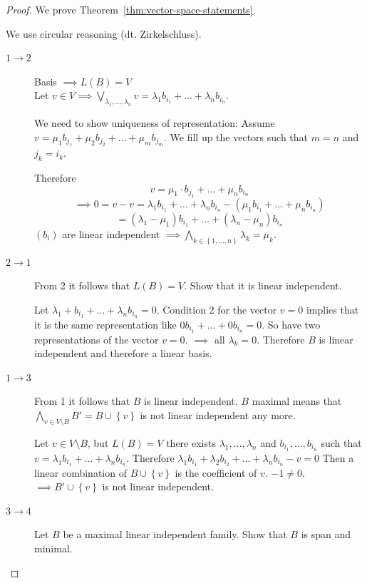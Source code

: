 \documentclass[a4paper,landscape,twocolumn]{article}
\newcommand\set[1]{\left\{#1\right\}}
\begin{document}
\begin{proof}
  We prove Theorem~\ref{thm:vector-space-statements}.

  We use circular reasoning (dt. Zirkelschluss).
  \begin{description}
    \item[$1 \rightarrow 2$]
      Basis $\implies L(B) = V$ \\
      Let $v \in V \implies \bigvee_{\lambda_1, \ldots, \lambda_n} v = \lambda_1 b_{i_1} + \ldots + \lambda_n b_{i_n}$.

      We need to show uniqueness of representation: Assume $v = \mu_1 b_{j_1} + \mu_2 b_{j_2} + \ldots + \mu_m b_{j_m}$.
      We fill up the vectors such that $m = n$ and $j_k = i_k$.

      Therefore
      \[ v = \mu_1 \cdot b_{j_1} + \ldots + \mu_n b_{i_n} \]
      \[
          \implies 0 = v - v = \lambda_1 b_{i_1} + \ldots + \lambda_n b_{i_n}
          - (\mu_1 b_{i_1} + \ldots + \mu_n b_{i_n})
      \] \[
          = (\lambda_1 - \mu_1) b_{i_1} + \ldots + (\lambda_n - \mu_n) b_{i_n}
      \]
      $(b_i)$ are linear independent $\implies \bigwedge_{k \in \set{1, \ldots, n}} \lambda_k = \mu_k$.
    \item[$2 \rightarrow 1$]
      From 2 it follows that $L(B) = V$.
      Show that it is linear independent.

      Let $\lambda_1 + b_{i_1} + \ldots + \lambda_n b_{i_n} = 0$.
      Condition 2 for the vector $v = 0$ implies that it is the same representation
      like $0 b_{i_1} + \ldots + 0 b_{i_n} = 0$.
      So have two representations of the vector $v = 0$.
      $\implies$ all $\lambda_k = 0$. Therefore $B$ is linear independent and therefore a linear basis.
    \item[$1 \rightarrow 3$]
      From 1 it follows that $B$ is linear independent.
      $B$ maximal means that $\bigwedge_{v \in V\setminus B} B' = B \cup \set{v}$ is not linear independent any more.

      Let $v \in V \setminus B$, but $L(B) = V$ there exists $\lambda_1, \ldots, \lambda_n$ and $b_{i_1}, \ldots, b_{i_n}$
      such that $v = \lambda_1 b_{i_1} + \ldots + \lambda_{n} b_{i_n}$.
      Therefore $\lambda_1 b_{i_1} + \lambda_2 b_{i_2} + \ldots + \lambda_n b_{i_n} - v = 0$
      Then a linear combination of $B \cup \set{v}$ is the coefficient of $v$. $-1 \neq 0$.
      $\implies B' \cup \set{v}$ is not linear independent.
    \item[$3 \rightarrow 4$]
      Let $B$ be a maximal linear independent family.
      Show that $B$ is span and minimal.


\end{description}
\end{proof}
\end{document}
